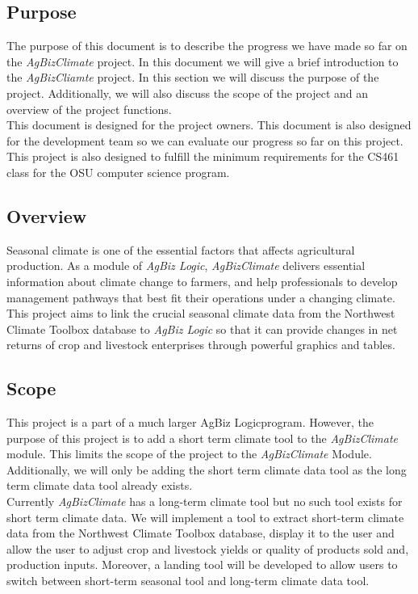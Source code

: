 \documentclass[onecolumn, draftclsnofoot,10pt, compsoc]{article}
\begin{document}
	\subsection{Purpose}
		The purpose of this document is to describe the progress we have made so far on the \textit{AgBizClimate} project. In this document we will give a brief introduction to the \textit{AgBizCliamte} project. In this section we will discuss the purpose of the project. Additionally, we will also discuss the scope of the project and an overview of the project functions.\\
		This document is designed for the project owners. This document is also designed for the development team so we can evaluate our progress so far on this project. This project is also designed to fulfill the minimum requirements for the CS461 class for the OSU computer science program.\\
		
				\subsection{Overview}
			Seasonal climate is one of the essential factors that affects agricultural production. As a module of \textit{AgBiz Logic}, \textit{AgBizClimate} delivers essential information about climate change to farmers, and help professionals to develop management pathways that best fit their operations under a changing climate. This project aims to link the crucial seasonal climate data from the Northwest Climate Toolbox database to \textit{AgBiz Logic} so that it can provide changes in net returns of crop and livestock enterprises through powerful graphics and tables.\\

		\subsection{Scope}
			This project is a part of a much larger AgBiz Logic\texttrademark program. However, the purpose of this project is to add a short term climate tool to the \textit{AgBizClimate} module. This limits the scope of the project to the \textit{AgBizClimate} Module. Additionally, we will only be adding the short term climate data tool as the long term climate data tool already exists.\\

			Currently \textit{AgBizClimate} has a long-term climate tool but no such tool exists for short term climate data. We will implement a tool to extract short-term climate data from the Northwest Climate Toolbox database, display it to the user and allow the user to adjust crop and livestock yields or quality of products sold and, production inputs. Moreover, a landing tool will be developed to allow users to switch between short-term seasonal tool and long-term climate data tool.\\
			
\end{document}
